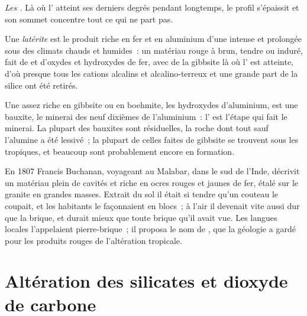 \emph{Les .} Là où l' atteint ses derniers degrés pendant longtemps,
le profil s'épaissit et son sommet concentre tout ce qui ne part pas.

\begin{definition}[Latérite]\label{def:b1:weathering-clays:laterite}
Une \emph{latérite} est le produit riche en fer et en aluminium d'une
 intense et prolongée sous des climats chauds et humides~: un
matériau rouge à brun, tendre ou induré, fait de  et d'oxydes et hydroxydes de fer,
avec de la gibbsite là où l' est atteinte, d'où presque tous les cations alcalins
et alcalino-terreux et une grande part de la silice ont été retirés.
\end{definition}

Une  assez riche en gibbsite ou en boehmite, les hydroxydes d'aluminium, est une
bauxite, le minerai des neuf dixièmes de l'aluminium~: l' est l'étape qui
fait le minerai. La plupart des bauxites sont résiduelles, la roche dont tout sauf
l'alumine a été lessivé~; la plupart de celles faites de gibbsite se trouvent sous
les tropiques, et beaucoup sont probablement encore en formation.

\begin{history}
En 1807 Francis Buchanan, voyageant au Malabar, dans le sud de l'Inde, décrivit
un matériau plein de cavités et riche en ocres rouges et jaunes de fer, étalé
sur le granite en grandes masses. Extrait du sol il était si tendre qu'un
couteau le coupait, et les habitants le façonnaient en blocs~; à l'air il devenait vite
aussi dur que la brique, et durait mieux que toute brique qu'il avait vue. Les
langues locales l'appelaient pierre-brique~; il proposa le nom de , que la
géologie a gardé pour les produits rouges de l'altération tropicale.
\end{history}

\section{Altération des silicates et dioxyde de carbone}\label{sec:b1:weathering-clays:co2}


